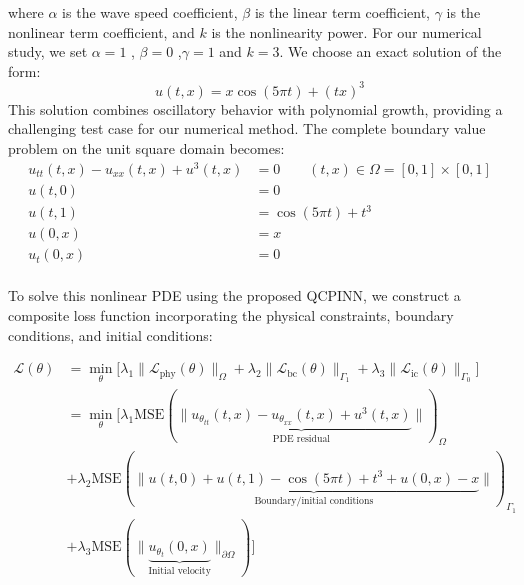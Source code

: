 \noindent where $\alpha$ is the wave speed coefficient, $\beta$ is the linear term coefficient, $\gamma$ is the nonlinear term coefficient, and $k$ is the nonlinearity power.
For our numerical study, we set $\alpha = 1$ , $\beta = 0$ ,$\gamma = 1$ and $k = 3$. We choose an exact solution of the form:
\begin{equation}
    u(t,x) = x\cos(5\pi t) + (tx)^3
\end{equation}
This solution combines oscillatory behavior with polynomial growth, providing a challenging test case for our numerical method.
%
The complete boundary value problem on the unit square domain becomes:
\begin{equation}
\begin{split}
        u_{tt}(t,x)- u_{xx}(t,x) + u^3(t,x) &= 0 \qquad(t ,x) \in \Omega =[0,1] \times [0,1]\\ 
        u(t,0) &= 0\\
        u(t,1) &= \cos(5\pi t) + t^3  \\
        u(0,x) &= x\\
        u_t(0,x) &= 0\\
\end{split}
\label{eq:Klein-Gordon}
\end{equation}

\noindent To solve this nonlinear PDE using the proposed QCPINN, we construct a composite loss function incorporating the physical constraints, boundary conditions, and initial conditions:

\begin{equation}
    \begin{split}
\mathcal{L}(\theta) &= \underset{\theta}{\min} \big[ \lambda_1 \|\mathcal{L}_{\text{phy}}(\theta)\|_{\Omega} + \lambda_2 \|\mathcal{L}_{\text{bc}}(\theta)\|_{\Gamma_1} + \lambda_3\|\mathcal{L}_{\text{ic}}(\theta)\|_{\Gamma_0} \big]\\
&= \underset{\theta}{\min} \big[ \lambda_1 \text{MSE}(\|\underbrace{u_{\theta_{tt}}(t,x) - u_{\theta_{xx}}(t,x) + u^3(t,x)}_{\text{PDE residual}}\|)_{\Omega}\\
&+ \lambda_2 \text{MSE}(\|\underbrace{u(t,0) + u(t,1)-\cos(5\pi t) + t^3 + u(0,x)-x}_{\text{Boundary/initial conditions}}\|)_{\Gamma_1} \\
&+ \lambda_3 \text{MSE}(\|\underbrace{u_{\theta_{t}}(0,x)}_{\text{Initial velocity}}\|_{\partial \Omega}) \big]\\
    \end{split} 
    \label{eq:Klein-Gordon_loss}
\end{equation}

